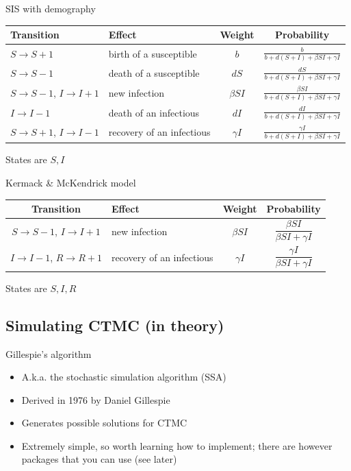 \documentclass[aspectratio=169]{beamer}\usepackage[]{graphicx}\usepackage[]{xcolor}
\begin{document}
\begin{frame}{SIS with demography}
    \begin{center}
        \begin{tabular}{p{3cm}p{3cm}cc}
        \toprule
            Transition & Effect & Weight & Probability \\
          \midrule
            $S\to S+1$ & birth of a susceptible & $b$ & $\frac{b}{b+d(S+I)+\beta SI+\gamma I}$ \\
            $S\to S-1$ & death of a susceptible & $dS$ & $\frac{dS}{b+d(S+I)+\beta SI+\gamma I}$ \\
            $S\to S-1$, $I\to I+1$ & new infection & $\beta SI$ & $\frac{\beta SI}{b+d(S+I)+\beta SI+\gamma I}$ \\
            $I\to I-1$ & death of an infectious & $dI$ & $\frac{dI}{b+d(S+I)+\beta SI+\gamma I}$ \\
            $S\to S+1$, $I\to I-1$ & recovery of an infectious & $\gamma I$ & $\frac{\gamma I}{b+d(S+I)+\beta SI+\gamma I}$ \\
            \bottomrule
        \end{tabular}
    \end{center}
\vfill
States are $S,I$
\end{frame}


\begin{frame}[fragile]{Kermack \& McKendrick model}
    \begin{center}
        \begin{tabular}{cp{3cm}cc}
        \toprule
            Transition & Effect & Weight & Probability \\
            \midrule
            $S\to S-1$, $I\to I+1$ & new infection & $\beta SI$ & $\dfrac{\beta SI}{\beta SI+\gamma I}$ \\
            $I\to I-1$, $R\to R+1$ & recovery of an infectious & $\gamma I$ & $\dfrac{\gamma I}{\beta SI+\gamma I}$ \\
            \bottomrule
        \end{tabular}
    \end{center}
    \vfill
    States are $S,I,R$
\end{frame}


\subsection{Simulating CTMC (in theory)}

\begin{frame}{Gillespie's algorithm}
    \begin{itemize}
        \item A.k.a. the stochastic simulation algorithm (SSA)
        \vfill
        \item Derived in 1976 by Daniel Gillespie
        \vfill
        \item Generates possible solutions for CTMC
        \vfill
        \item Extremely simple, so worth learning how to implement; there are however packages that you can use (see later)
    \end{itemize}
\end{frame}
\end{document}

